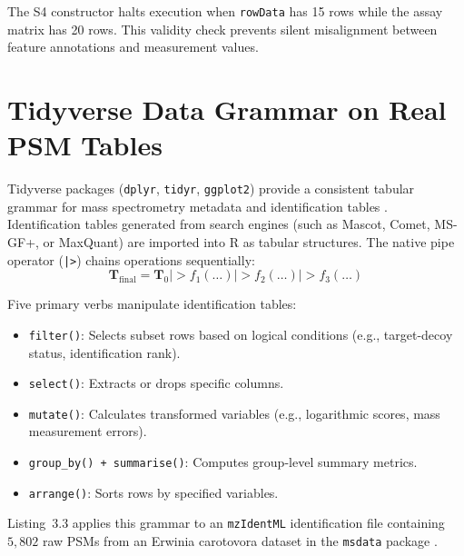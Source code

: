 \documentclass[11pt,twoside,openright]{book}
\begin{document}
The S4 constructor halts execution when \texttt{rowData} has 15 rows while the assay matrix has 20 rows. This validity check prevents silent misalignment between feature annotations and measurement values.

\FloatBarrier
\section{Tidyverse Data Grammar on Real PSM Tables}
\label{sec:tidyverse}

Tidyverse packages (\texttt{dplyr}, \texttt{tidyr}, \texttt{ggplot2}) provide a consistent tabular grammar for mass spectrometry metadata and identification tables \cite{wickham2019welcome, wickham2014tidy}. Identification tables generated from search engines (such as Mascot, Comet, MS-GF+, or MaxQuant) are imported into R as tabular structures. The native pipe operator (\texttt{|>}) chains operations sequentially:
\begin{equation}
\mathbf{T}_{\text{final}} = \mathbf{T}_0 \mid> f_1(\dots) \mid> f_2(\dots) \mid> f_3(\dots)
\label{eq:pipe_syntax}
\end{equation}

Five primary verbs manipulate identification tables:
\begin{itemize}
\item \texttt{filter()}: Selects subset rows based on logical conditions (e.g., target-decoy status, identification rank).
\item \texttt{select()}: Extracts or drops specific columns.
\item \texttt{mutate()}: Calculates transformed variables (e.g., logarithmic scores, mass measurement errors).
\item \texttt{group\_by() + summarise()}: Computes group-level summary metrics.
\item \texttt{arrange()}: Sorts rows by specified variables.
\end{itemize}

Listing~3.3 applies this grammar to an \texttt{mzIdentML} identification file containing $5{,}802$ raw PSMs from an Erwinia carotovora dataset in the \texttt{msdata} package \cite{gatto2023msdata}.
\end{document}
